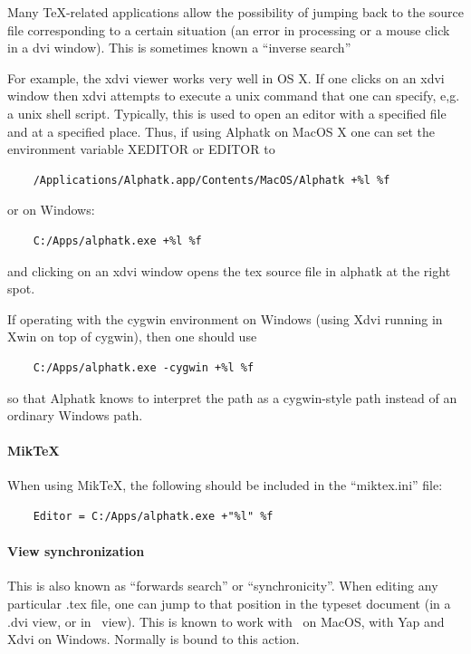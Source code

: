 \documentclass{report}
\begin{document}
Many TeX-related applications allow the possibility of jumping back
to the source file corresponding to a certain situation (an error in 
processing or a mouse click in a dvi window).  This is sometimes
known a ``inverse search''

For example, the xdvi viewer works very well in OS X. If one clicks on
an xdvi window then xdvi attempts to execute a unix command that one
can specify, e,g.  a unix shell script.  Typically, this is used to
open an editor with a specified file and at a specified place.  Thus,
if using Alphatk on MacOS X one can set the environment variable
XEDITOR or EDITOR to
\begin{verbatim}
    /Applications/Alphatk.app/Contents/MacOS/Alphatk +%l %f
\end{verbatim}
or on Windows:
\begin{verbatim}
    C:/Apps/alphatk.exe +%l %f
\end{verbatim}
and clicking on an xdvi window opens the tex source file in alphatk at
the right spot.

If operating with the cygwin environment on Windows (using Xdvi
running in Xwin on top of cygwin), then one should use 
\begin{verbatim}
    C:/Apps/alphatk.exe -cygwin +%l %f
\end{verbatim}
so that Alphatk knows to interpret the path as a cygwin-style path
instead of an ordinary Windows path.

\paragraph{MikTeX}

When using MikTeX, the following should be included in the
``miktex.ini'' file:
\begin{verbatim}
    Editor = C:/Apps/alphatk.exe +"%l" %f
\end{verbatim}

\paragraph{View synchronization}

This is also known as ``forwards search'' or ``synchronicity''.  When
editing any particular .tex file, one can jump to that position in the
typeset document (in a .dvi view, or in \Textures\ view).  This is
known to work with \Textures\ on MacOS, with Yap and Xdvi on Windows.
Normally  is bound to this action.
\end{document}
